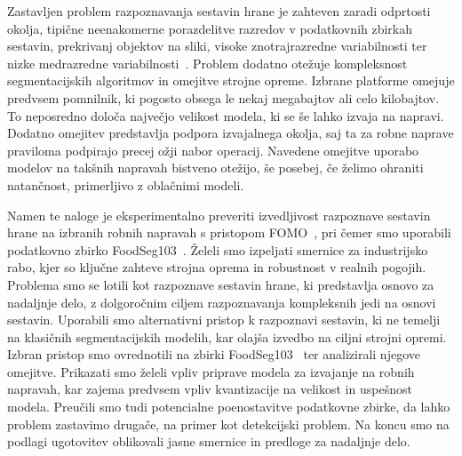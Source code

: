 \documentclass[a4paper,twoside,openright,12pt,slovene]{book}
\begin{document}

    Zastavljen problem razpoznavanja sestavin hrane je zahteven zaradi
    odprtosti okolja, tipične neenakomerne porazdelitve razredov v podatkovnih
    zbirkah sestavin, prekrivanj objektov na sliki, visoke znotrajrazredne
    variabilnosti ter nizke medrazredne variabilnosti~\cite{src:wu2021large,
    src:bossard2014food}. Problem dodatno otežuje kompleksnost segmentacijskih
    algoritmov in omejitve strojne opreme. Izbrane platforme omejuje predvsem
    pomnilnik, ki pogosto obsega le nekaj megabajtov ali celo kilobajtov. To
    neposredno določa največjo velikost modela, ki se še lahko izvaja na
    napravi. Dodatno omejitev predstavlja podpora izvajalnega okolja, saj ta za
    robne naprave praviloma podpirajo precej ožji nabor operacij. Navedene
    omejitve uporabo modelov na takšnih napravah bistveno otežijo, še posebej,
    če želimo ohraniti natančnost, primerljivo z oblačnimi modeli.


    Namen te naloge je eksperimentalno preveriti izvedljivost razpoznave
    sestavin hrane na izbranih robnih napravah s pristopom
    FOMO~\cite{src:announcingfomo}, pri čemer smo uporabili podatkovno zbirko
    FoodSeg103~\cite{src:wu2021large}. Želeli smo izpeljati smernice za
    industrijsko rabo, kjer so ključne zahteve strojna oprema in robustnost v
    realnih pogojih. Problema smo se lotili kot razpoznave sestavin hrane, ki
    predstavlja osnovo za nadaljnje delo, z dolgoročnim ciljem razpoznavanja kompleksnih
    jedi na osnovi sestavin. Uporabili smo alternativni pristop k razpoznavi
    sestavin, ki ne temelji na klasičnih segmentacijskih modelih, kar olajša izvedbo na ciljni strojni opremi.
    Izbran pristop smo ovrednotili na zbirki FoodSeg103~\cite{src:wu2021large}
    ter analizirali njegove omejitve.
    Prikazati smo želeli vpliv priprave modela za izvajanje na robnih napravah,
    kar zajema predvsem vpliv kvantizacije na velikost in uspešnost modela.
    Preučili smo tudi potencialne poenostavitve podatkovne zbirke, da lahko
    problem zastavimo drugače, na primer kot detekcijski problem. Na koncu smo na
    podlagi ugotovitev oblikovali jasne smernice in predloge za nadaljnje delo.
\end{document}
